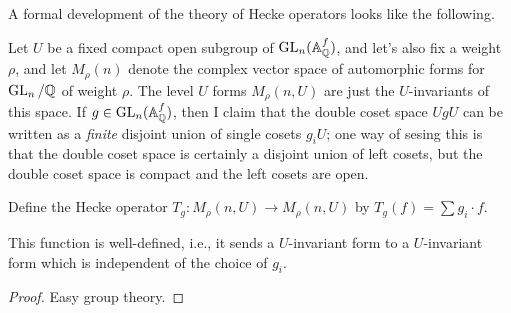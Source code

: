A formal development of the theory of Hecke operators looks like the following.

Let $U$ be a fixed compact open subgroup of $\operatorname{GL}_n(\mathbb{A}_{\mathbb{Q}}^f)$, and let's also fix
a weight $\rho$, and let $M_\rho(n)$ denote the complex vector space of automorphic
forms for $\operatorname{GL}_n/\mathbb{Q}$ of weight $\rho$. The level $U$ forms $M_\rho(n,U)$ are just the $U$-invariants
of this space. If $g\in\operatorname{GL}_n(\mathbb{A}_{\mathbb{Q}}^f)$, then I
claim that the double coset space $UgU$ can be written as a \emph{finite} disjoint union
of single cosets $g_iU$; one way of sesing this is that the double coset space is certainly
a disjoint union of left cosets, but the double coset space is compact and the left cosets
are open.

Define the Hecke operator $T_g:M_\rho(n,U)\to M_\rho(n,U)$ by
$T_g(f)=\sum g_i\cdot f$.

\begin{lemma} This function is well-defined, i.e., it sends a $U$-invariant form to
  a $U$-invariant form which is independent of the choice of $g_i$.
\end{lemma}
\begin{proof} Easy group theory.
\end{proof}
